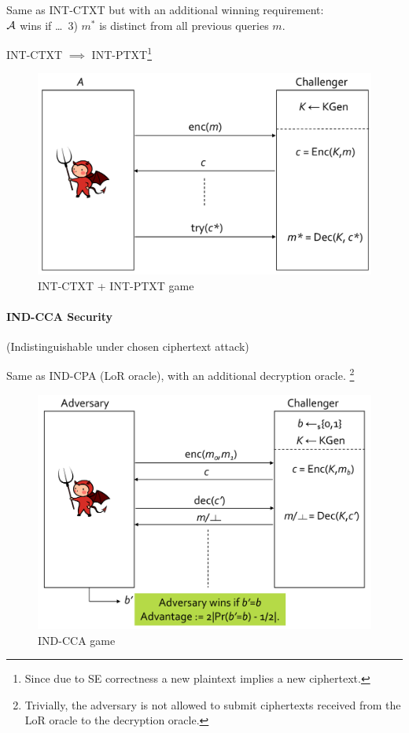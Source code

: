 Same as INT-CTXT but with an additional winning requirement: \\
$\mathcal{A}$ wins if \dots\ 3) $m^*$ is distinct from all previous queries $m$.

INT-CTXT $\implies$ INT-PTXT\footnote{Since due to SE correctness a new plaintext implies a new ciphertext.}

\begin{figure}[h]
    \centering
	\includegraphics[scale=0.32]{images/int-ctxt-ptxt.png}
    \caption{INT-CTXT + INT-PTXT game}
    \label{fig:int-ctxt-ptxt}
\end{figure}

\paragraph{IND-CCA Security}
(Indistinguishable under chosen ciphertext attack)

Same as IND-CPA (LoR oracle), with an additional decryption oracle.%
\footnote{Trivially, the adversary is not allowed to submit ciphertexts received from the LoR oracle to the decryption oracle.}

\begin{figure}[h]
    \centering
	\includegraphics[scale=0.4]{images/ind-cca.png}
    \caption{IND-CCA game}
    \label{fig:ind-cca}
\end{figure}


